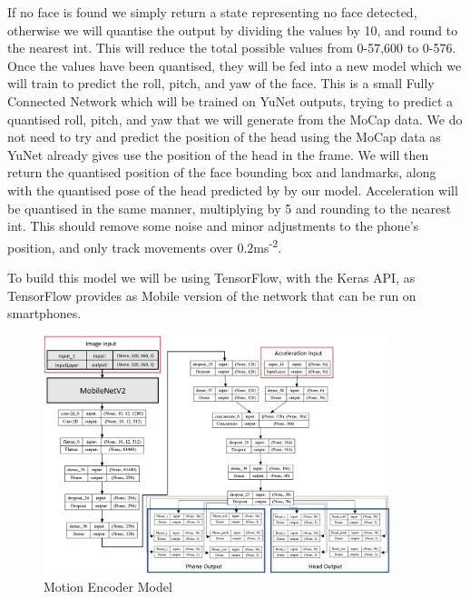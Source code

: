 If no face is found we simply return a state representing no face detected, otherwise we will quantise the output by dividing the values by 10, and round to the nearest int. This will reduce the total possible values from 0-57,600 to 0-576.
Once the values have been quantised, they will be fed into a new model which we will train to predict the roll, pitch, and yaw of the face.
This is a small Fully Connected Network which will be trained on YuNet outputs, trying to predict a quantised roll, pitch, and yaw that we will generate from the MoCap data.
We do not need to try and predict the position of the head using the MoCap data as YuNet already gives use the position of the head in the frame. We will then return the quantised position of the face bounding box and landmarks, along with the quantised pose of the head predicted by by our model.
Acceleration will be quantised in the same manner, multiplying by 5 and rounding to the nearest int. This should remove some noise and minor adjustments to the phone's position, and only track movements over 0.2ms\textsuperscript{-2}.

To build this model we will be using TensorFlow, with the Keras API, as TensorFlow provides as Mobile version of the network that can be run on smartphones.

\begin{figure}
    \centering
    \includegraphics[width=0.9\textwidth]{figures/TL_Model_Clean.png}
    \caption{\label{fig:motion_encoder} Motion Encoder Model}
\end{figure}

